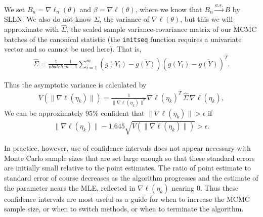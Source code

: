 We set $B_n = \nabla \ell_n( \theta)$ and $\beta =\nabla \ell( \theta)$, where we 
know that $B_n \stackrel{a.s.}{\longrightarrow} B$ by SLLN.  
We also do not know $\Sigma$, the variance of $\nabla \ell( \theta)$, but this we will 
approximate with $
\hat{\Sigma}$, the scaled sample variance-covariance matrix of our MCMC batches of 
the canonical statistic (the \texttt{initseq} function 
requires a univariate vector and so cannot be used here).  That is,
\begin{align*}
	\hat{\Sigma} = \frac{1}{nbatch}\frac{1}{m-1}\sum_{i=1}^{m} (g(Y_i) - \overline{g
(Y)})( g(Y_i) - 
\overline{g(Y)})^T.
\end{align*}

Thus the asymptotic variance is calculated by
\begin{align*}
	V \left( \lVert \nabla \ell( \eta_k ) \rVert \right )= \frac{1}{\lVert \nabla \ell
( \eta_k ) \rVert^2} \nabla \ell
( \eta_k )^T \, \hat{\Sigma} \,  \nabla \ell( \eta_k ),
\end{align*}%
We can be approximately 95\% confident that $\lVert 
\nabla \ell( \eta_k ) \rVert > \epsilon$ if 
\begin{align*}
	\lVert \nabla \ell( \eta_k ) \rVert - 1.645 \sqrt{ V \left( \lVert \nabla \ell
( \eta_k ) \rVert \right )} > 
\epsilon.
\end{align*}

In practice, however, use of confidence intervals does not appear necessary with  
Monte Carlo sample sizes that are set 
large enough so that these standard errors are initially small relative to the point 
estimates.  The ratio of point 
estimate to standard error of course decreases as the algorithm progresses and the 
estimate of the parameter nears the 
MLE, reflected in $\nabla \ell( \eta_k )$ nearing 0.  Thus these confidence intervals 
are most useful as a guide for
when to increase the MCMC sample size, or when to switch methods, or when to terminate 
the algorithm.



